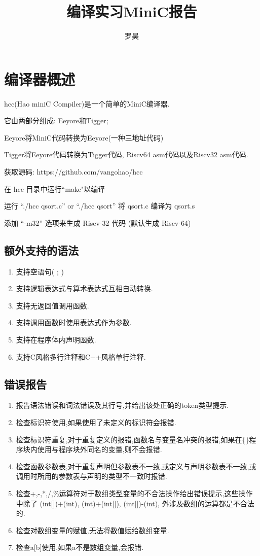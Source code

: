 \documentclass[UTF8]{article}
\begin{document}
\title{编译实习MiniC报告}
\author{罗昊}
\maketitle
\tableofcontents
\section{编译器概述}
hcc(Hao miniC Compiler)是一个简单的MiniC编译器.

它由两部分组成: Eeyore和Tigger;

Eeyore将MiniC代码转换为Eeyore(一种三地址代码)

Tigger将Eeyore代码转换为Tigger代码, Riscv64 asm代码以及Riscv32 asm代码.

获取源码: https://github.com/vangohao/hcc

在 hcc 目录中运行``make"以编译

运行 ``./hcc qsort.c'' or ``./hcc qsort'' 将 qsort.c 编译为 qsort.s

添加 ``-m32'' 选项来生成 Riscv-32 代码 (默认生成 Riscv-64)

\subsection{额外支持的语法}
\begin{enumerate}
\item 支持空语句( ; )
\item 支持逻辑表达式与算术表达式互相自动转换.
\item 支持无返回值调用函数.
\item 支持调用函数时使用表达式作为参数.
\item 支持在程序体内声明函数.
\item 支持C风格多行注释和C++风格单行注释.
\end{enumerate}
\subsection{错误报告}
\begin{enumerate}
\item 报告语法错误和词法错误及其行号,并给出该处正确的token类型提示.
\item 检查标识符使用,如果使用了未定义的标识符会报错.
\item 检查标识符重复,对于重复定义的报错,函数名与变量名冲突的报错,如果在\{\}程序块内使用与程序块外同名的变量,则不会报错.
\item 检查函数参数表,对于重复声明但参数表不一致,或定义与声明参数表不一致,或调用时所用的参数表与声明的类型不一致时报错.
\item 检查+,-,*,/,\%运算符对于数组类型变量的不合法操作给出错误提示,这些操作中除了 (int[])+(int), (int)+(int[]), (int[])-(int), 外涉及数组的运算都是不合法 的.
\item 检查对数组变量的赋值,无法将数值赋给数组变量.
\item 检查a[b]使用,如果a不是数组变量,会报错.
\end{enumerate}
\end{document}

